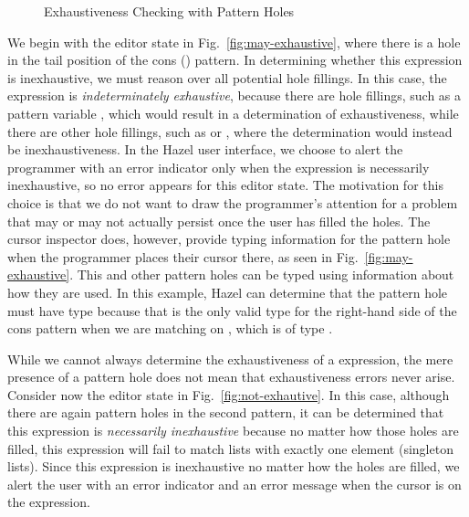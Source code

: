 \begin{figure}
{}
\hfil
  \caption{Exhaustiveness Checking with Pattern Holes}
  \label{fig:exhaustiveness}
\end{figure}

We begin with the editor state in Fig.~\ref{fig:may-exhaustive}, 
where there is a hole in the tail position of the cons (\li{::}) pattern.
In determining whether this  expression is inexhaustive, we 
must reason over all potential hole fillings. In this case, the 
 expression is \emph{indeterminately exhaustive}, because there are hole fillings,
such as a pattern variable , which would result in a determination
of exhaustiveness, while there are other hole fillings, such as \li{[]} or ,
where the determination would instead be inexhaustiveness. In the Hazel user interface, we choose to alert the programmer with an error
indicator only when the  expression is necessarily inexhaustive,
so no error appears for this editor state. The motivation for this choice is that we do not want to draw the programmer's attention for a problem that may or may not actually persist once the user has filled the holes. The cursor inspector does, however, provide typing information for the pattern hole when the programmer places their cursor there, as seen in Fig.~\ref{fig:may-exhaustive}. This and other pattern holes can be typed using information about how they are used. In this example, Hazel can determine that the pattern hole must have type \li{[Int]} because that is the only valid type for the right-hand side of the cons pattern when we are matching on , which is of type \li{[Int]}.

While we cannot always determine the exhaustiveness of a  expression, the mere presence of a pattern hole does not mean that exhaustiveness errors never arise. Consider now
the editor state in Fig.~\ref{fig:not-exhautive}. In this case,
although there are again pattern holes in the second pattern, 
it can be determined that this  expression is \emph{necessarily inexhaustive}
because no matter how those holes are filled, this  expression will fail to 
match lists with exactly one element (singleton lists). Since this  expression is inexhaustive no matter how the holes are filled,
we alert the user with an error indicator and an error message when the cursor is on the  expression.


